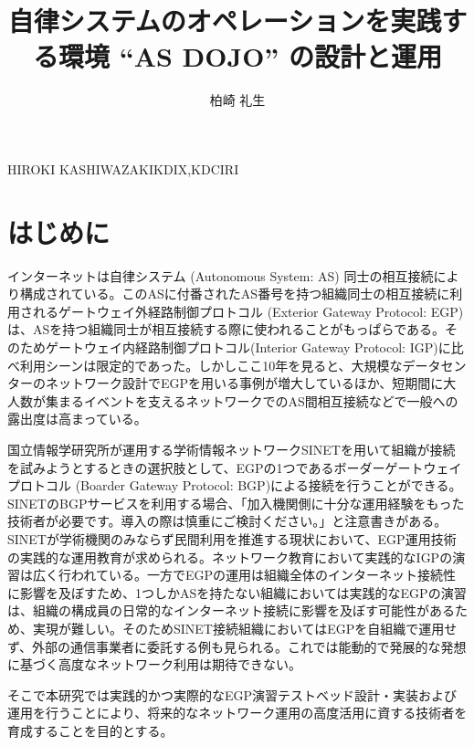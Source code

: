 \documentclass[Japanese]{dicomopapers}
\begin{document}
\title{自律システムのオペレーションを実践する環境 ``AS DOJO'' の設計と運用}



\author{柏崎 礼生}{HIROKI KASHIWAZAKI}{KDIX,KDCIRI}

\maketitle

\section{はじめに}

インターネットは自律システム (Autonomous System: AS) 同士の相互接続により構成されている。このASに付番されたAS番号を持つ組織同士の相互接続に利用されるゲートウェイ外経路制御プロトコル (Exterior Gateway Protocol: EGP) は、ASを持つ組織同士が相互接続する際に使われることがもっぱらである。そのためゲートウェイ内経路制御プロトコル(Interior Gateway Protocol: IGP)に比べ利用シーンは限定的であった。しかしここ10年を見ると、大規模なデータセンターのネットワーク設計でEGPを用いる事例が増大しているほか、短期間に大人数が集まるイベントを支えるネットワークでのAS間相互接続などで一般への露出度は高まっている。

国立情報学研究所が運用する学術情報ネットワークSINETを用いて組織が接続を試みようとするときの選択肢として、EGPの1つであるボーダーゲートウェイプロトコル (Boarder Gateway Protocol: BGP)による接続を行うことができる。SINETのBGPサービスを利用する場合、「加入機関側に十分な運用経験をもった技術者が必要です。導入の際は慎重にご検討ください。」と注意書きがある。SINETが学術機関のみならず民間利用を推進する現状において、EGP運用技術の実践的な運用教育が求められる。ネットワーク教育において実践的なIGPの演習は広く行われている。一方でEGPの運用は組織全体のインターネット接続性に影響を及ぼすため、1つしかASを持たない組織においては実践的なEGPの演習は、組織の構成員の日常的なインターネット接続に影響を及ぼす可能性があるため、実現が難しい。そのためSINET接続組織においてはEGPを自組織で運用せず、外部の通信事業者に委託する例も見られる。これでは能動的で発展的な発想に基づく高度なネットワーク利用は期待できない。

そこで本研究では実践的かつ実際的なEGP演習テストベッド設計・実装および運用を行うことにより、将来的なネットワーク運用の高度活用に資する技術者を育成することを目的とする。
\end{document}
